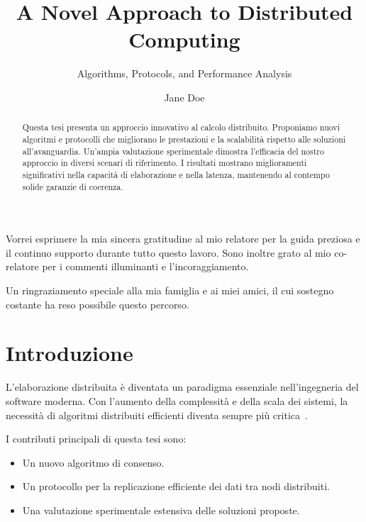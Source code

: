 \documentclass[master,italian,fem,lof,lot]{tvthesis}
\title{A Novel Approach to Distributed Computing}
\subtitle{Algorithms, Protocols, and Performance Analysis}
\author{Jane Doe}
\begin{document}
\maketitle

\frontmatter

\dedication{Alla mia famiglia}

\tableofcontents



\begin{acknowledgments}
Vorrei esprimere la mia sincera gratitudine al mio relatore per la guida preziosa e il continuo supporto durante tutto questo lavoro. Sono inoltre grato al mio co-relatore per i commenti illuminanti e l’incoraggiamento.

Un ringraziamento speciale alla mia famiglia e ai miei amici, il cui sostegno costante ha reso possibile questo percorso.
\end{acknowledgments}


\begin{abstract}
Questa tesi presenta un approccio innovativo al calcolo distribuito.
Proponiamo nuovi algoritmi e protocolli che migliorano le prestazioni
e la scalabilità rispetto alle soluzioni all’avanguardia. Un’ampia valutazione
sperimentale dimostra l’efficacia del nostro approccio in diversi scenari
di riferimento. I risultati mostrano miglioramenti significativi nella
capacità di elaborazione e nella latenza, mantenendo al contempo
solide garanzie di coerenza.
\end{abstract}


\mainmatter

\chapter{Introduzione}
\label{ch:introduction}

L'elaborazione distribuita è diventata un paradigma essenziale nell'ingegneria del software moderna. Con l'aumento della complessità e della scala dei sistemi, la necessità di algoritmi distribuiti efficienti diventa sempre più critica~\cite{tanenbaum2007}.

I contributi principali di questa tesi sono:
\begin{itemize}
    \item Un nuovo algoritmo di consenso.
    \item Un protocollo per la replicazione efficiente dei dati tra nodi distribuiti.
    \item Una valutazione sperimentale estensiva delle soluzioni proposte.
\end{itemize}
\end{document}

